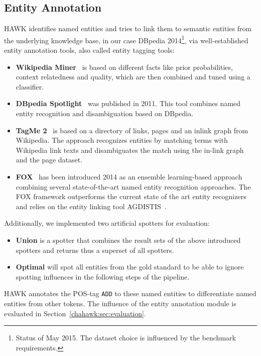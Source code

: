\subsection{Entity Annotation}
HAWK identifies named entities and tries to link them to semantic entities from the underlying knowledge base, in our case DBpedia 2014\footnote{Status of May 2015. The dataset choice is influenced by the benchmark requirements.}, via well-established entity annotation tools, also called entity tagging tools:
\begin{itemize}
\item \textbf{Wikipedia Miner}~\cite{milne2008learning} is based on different facts like prior probabilities, context relatedness and quality, which are then combined and tuned using a classifier.
\item \textbf{DBpedia Spotlight}~\cite{spotlight} %
was published in 2011. 
This tool combines named entity recognition and disambiguation based on DBpedia.
\item \textbf{TagMe 2}~\cite{TagMe2} is based on a directory of links, pages and an inlink graph from Wikipedia.
The approach recognizes entities by matching terms with Wikipedia link texts and disambiguates the match using the in-link graph and the page dataset.
\item \textbf{FOX}~\cite{FOX} has been introduced 2014 as an ensemble learning-based approach combining several state-of-the-art named entity recognition approaches. 
The FOX framework outperforms the current state of the art entity recognizers and relies on the entity linking tool AGDISTIS~\cite{agdistis_iswc}.
\end{itemize}
Additionally, we implemented two artificial spotters for evaluation:
\begin{itemize}
\item \textbf{Union} is a spotter that combines the result sets of the above introduced spotters and returns thus a superset of all spotters.
\item \textbf{Optimal} will spot all entities from the gold standard to be able to ignore spotting influences in the following steps of the pipeline.
\end{itemize}

HAWK annotates the POS-tag \texttt{ADD} to these named entities to differentiate named entities from other tokens. %
The influence of the entity annotation module is evaluated in Section~\ref{chahawk:sec:evaluation}.

